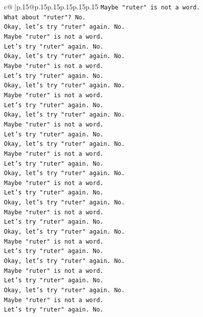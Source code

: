 \documentclass{article}
\begin{document}
{\begin{supertabular}{c@{$\;$}|p{.15\linewidth}@{}p{.15\linewidth}p{.15\linewidth}p{.15\linewidth}p{.15\linewidth}p{.15\linewidth}}
{{{\texttt{Maybe "ruter" is not a word.} \\
\texttt{What about "ruter"? No.} \\
\texttt{Okay, let's try "ruter" again. No.} \\
\texttt{Maybe "ruter" is not a word.} \\
\texttt{Let's try "ruter" again. No.} \\
\texttt{Okay, let's try "ruter" again. No.} \\
\texttt{Maybe "ruter" is not a word.} \\
\texttt{Let's try "ruter" again. No.} \\
\texttt{Okay, let's try "ruter" again. No.} \\
\texttt{Maybe "ruter" is not a word.} \\
\texttt{Let's try "ruter" again. No.} \\
\texttt{Okay, let's try "ruter" again. No.} \\
\texttt{Maybe "ruter" is not a word.} \\
\texttt{Let's try "ruter" again. No.} \\
\texttt{Okay, let's try "ruter" again. No.} \\
\texttt{Maybe "ruter" is not a word.} \\
\texttt{Let's try "ruter" again. No.} \\
\texttt{Okay, let's try "ruter" again. No.} \\
\texttt{Maybe "ruter" is not a word.} \\
\texttt{Let's try "ruter" again. No.} \\
\texttt{Okay, let's try "ruter" again. No.} \\
\texttt{Maybe "ruter" is not a word.} \\
\texttt{Let's try "ruter" again. No.} \\
\texttt{Okay, let's try "ruter" again. No.} \\
\texttt{Maybe "ruter" is not a word.} \\
\texttt{Let's try "ruter" again. No.} \\
\texttt{Okay, let's try "ruter" again. No.} \\
\texttt{Maybe "ruter" is not a word.} \\
\texttt{Let's try "ruter" again. No.} \\
\texttt{Okay, let's try "ruter" again. No.} \\
\texttt{Maybe "ruter" is not a word.} \\
\texttt{Let's try "ruter" again. No.} \\
}}}
\end{supertabular}}
\end{document}

